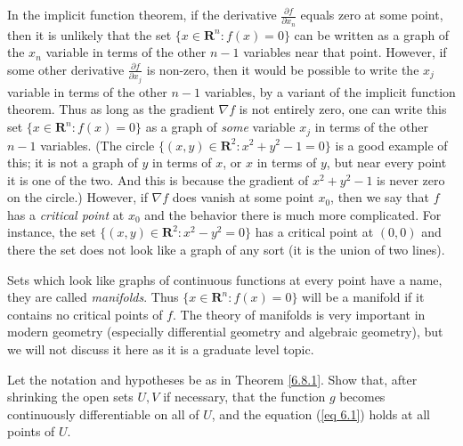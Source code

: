 \begin{note}
    In the implicit function theorem, if the derivative \(\frac{\partial f}{\partial x_n}\) equals zero at some point, then it is unlikely that the set \(\{x \in \mathbf{R}^n : f(x) = 0\}\) can be written as a graph of the \(x_n\) variable in terms of the other \(n - 1\) variables near that point.
    However, if some other derivative \(\frac{\partial f}{\partial x_j}\) is non-zero, then it would be possible to write the \(x_j\) variable in terms of the other \(n - 1\) variables, by a variant of the implicit function theorem.
    Thus as long as the gradient \(\nabla f\) is not entirely zero, one can write this set \(\{x \in \mathbf{R}^n : f(x) = 0\}\) as a graph of \emph{some} variable \(x_j\) in terms of the other \(n - 1\) variables.
    (The circle \(\{(x, y) \in \mathbf{R}^2 : x^2 + y^2 - 1 = 0\}\) is a good example of this;
    it is not a graph of \(y\) in terms of \(x\), or \(x\) in terms of \(y\), but near every point it is one of the two.
    And this is because the gradient of \(x^2 + y^2 - 1\) is never zero on the circle.)
    However, if \(\nabla f\) does vanish at some point \(x_0\), then we say that \(f\) has a \emph{critical point} at \(x_0\) and the behavior there is much more complicated.
    For instance, the set \(\{(x, y) \in \mathbf{R}^2 : x^2 - y^2 = 0\}\) has a critical point at \((0, 0)\) and there the set does not look like a graph of any sort
    (it is the union of two lines).
\end{note}

\begin{remark}\label{6.8.4}
    Sets which look like graphs of continuous functions at every point have a name, they are called \emph{manifolds}.
    Thus \(\{x \in \mathbf{R}^n : f(x) = 0\}\) will be a manifold if it contains no critical points of \(f\).
    The theory of manifolds is very important in modern geometry (especially differential geometry and algebraic geometry), but we will not discuss it here as it is a graduate level topic.
\end{remark}

\exercisesection

\begin{exercise}\label{ex 6.8.1}
    Let the notation and hypotheses be as in Theorem \ref{6.8.1}.
    Show that, after shrinking the open sets \(U, V\) if necessary, that the function \(g\) becomes continuously differentiable on all of \(U\), and the equation (\ref{eq 6.1}) holds at all points of \(U\).
\end{exercise}